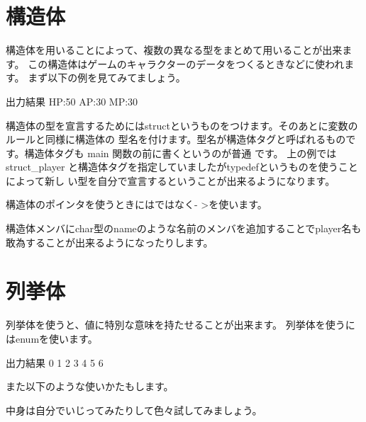﻿\section{構造体}
構造体を用いることによって、複数の異なる型をまとめて用いることが出来ます。
この構造体はゲームのキャラクターのデータをつくるときなどに使われます。
まず以下の例を見てみてましょう。


\begin{itembox}{出力結果}
HP:50 AP:30 MP:30
\end{itembox}
構造体の型を宣言するためにはstructというものをつけます。そのあとに変数のルールと同様に構造体の
型名を付けます。型名が構造体タグと呼ばれるものです。構造体タグも main 関数の前に書くというのが普通
です。
上の例では struct\_player と構造体タグを指定していましたがtypedefというものを使うことによって新し
い型を自分で宣言するということが出来るようになります。



構造体のポインタを使うときには\*ではなく- \textgreater を使います。



構造体メンバにchar型のnameのような名前のメンバを追加することでplayer名も敢為することが出来るようになったりします。

\section{列挙体}
列挙体を使うと、値に特別な意味を持たせることが出来ます。
列挙体を使うにはenumを使います。



\begin{itembox}{出力結果}
0 1 2 3 4 5 6
\end{itembox}
また以下のような使いかたもします。


中身は自分でいじってみたりして色々試してみましょう。


